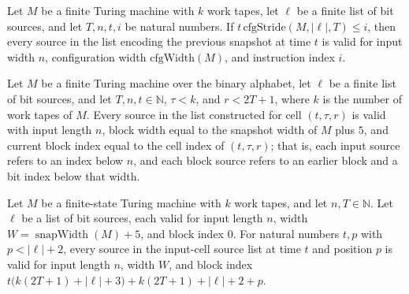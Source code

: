 \begin{theorem}
\label{Complexity.prevSnapSrcs_valid}
\leanok
{}
Let $M$ be a finite Turing machine with $k$ work tapes, let $\ell$ be a finite list of
bit sources, and let $T,n,t,i$ be natural numbers. If
$t\,\mathrm{cfgStride}(M,|\ell|,T)\le i$, then every source in the list encoding the
previous snapshot at time $t$ is valid for input width $n$, configuration width
$\mathrm{cfgWidth}(M)$, and instruction index $i$.
\end{theorem}

\begin{theorem}
\label{Complexity.cellSrcs_valid}
\leanok
{}
Let $M$ be a finite Turing machine over the binary alphabet, let $\ell$ be a finite list
of bit sources, and let $T,n,t\in\mathbb{N}$, $\tau<k$, and $r<2T+1$, where $k$ is the
number of work tapes of $M$. Every source in the list constructed for cell $(t,\tau,r)$
is valid with input length $n$, block width equal to the snapshot width of $M$ plus $5$,
and current block index equal to the cell index of $(t,\tau,r)$; that is, each input
source refers to an index below $n$, and each block source refers to an earlier block
and a bit index below that width.
\end{theorem}

\begin{theorem}
\label{Complexity.inpSrcs_valid}
\leanok
{}
Let $M$ be a finite-state Turing machine with $k$ work tapes, and let
$n,T\in\mathbb{N}$. Let $\ell$ be a list of bit sources, each valid for input length
$n$, width $W=\operatorname{snapWidth}(M)+5$, and block index $0$. For natural numbers
$t,p$ with $p<|\ell|+2$, every source in the input-cell source list at time $t$ and
position $p$ is valid for input length $n$, width $W$, and block index
$t\bigl(k(2T+1)+|\ell|+3\bigr)+k(2T+1)+|\ell|+2+p$.
\end{theorem}

